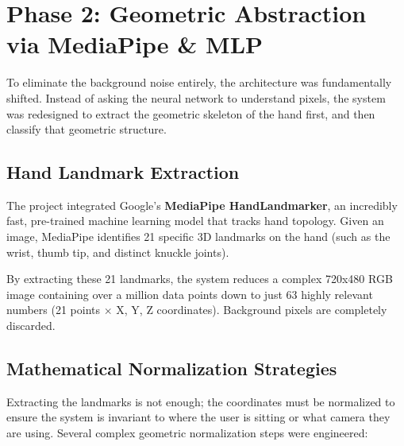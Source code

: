 \documentclass[12pt,a4paper]{article}
\begin{document}
\section{Phase 2: Geometric Abstraction via MediaPipe \& MLP}

To eliminate the background noise entirely, the architecture was fundamentally shifted. Instead of asking the neural network to understand pixels, the system was redesigned to extract the geometric skeleton of the hand first, and then classify that geometric structure.

\subsection{Hand Landmark Extraction}
The project integrated Google's \textbf{MediaPipe HandLandmarker}, an incredibly fast, pre-trained machine learning model that tracks hand topology. Given an image, MediaPipe identifies 21 specific 3D landmarks on the hand (such as the wrist, thumb tip, and distinct knuckle joints). 

By extracting these 21 landmarks, the system reduces a complex 720x480 RGB image containing over a million data points down to just 63 highly relevant numbers (21 points $\times$ X, Y, Z coordinates). Background pixels are completely discarded.

\subsection{Mathematical Normalization Strategies}
Extracting the landmarks is not enough; the coordinates must be normalized to ensure the system is invariant to where the user is sitting or what camera they are using. Several complex geometric normalization steps were engineered:
\end{document}
